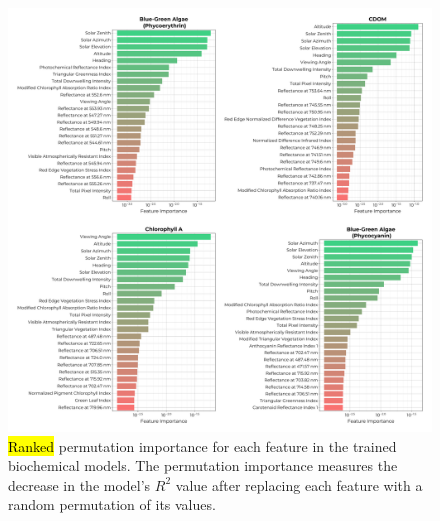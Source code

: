 \documentclass[remotesensing,article,accept,pdftex,moreauthors]{Definitions/mdpi}
\begin{document}
\begin{figure}[H]

\vspace{-0.15in}
\hspace{-6pt}\includegraphics[width=0.9\columnwidth]{figures/results/fits/biochemical-ranking.pdf}
\vspace{-0.1in}
\caption{\hl{Ranked} %
 permutation importance for each feature in the trained biochemical models. The permutation importance measures the decrease in the model's $R^2$ value after replacing each feature with a random permutation of its values.\label{fig:biochem-fi}}
\end{figure}  
\end{document}
